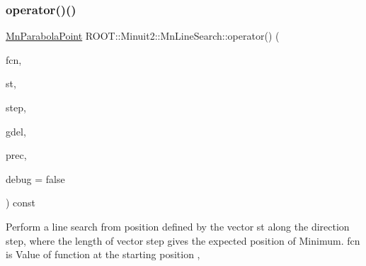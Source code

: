 \subsubsection{\texorpdfstring{operator()()}{operator()()}\hspace{0.1cm}{\footnotesize\ttfamily [1/3]}}
{\footnotesize\ttfamily \mbox{\hyperlink{classROOT_1_1Minuit2_1_1MnParabolaPoint}{Mn\+Parabola\+Point}} R\+O\+O\+T\+::\+Minuit2\+::\+Mn\+Line\+Search\+::operator() (\begin{DoxyParamCaption}\item[{const \mbox{\hyperlink{classROOT_1_1Minuit2_1_1MnFcn}{Mn\+Fcn}} \&}]{fcn,  }\item[{const \mbox{\hyperlink{classROOT_1_1Minuit2_1_1MinimumParameters}{Minimum\+Parameters}} \&}]{st,  }\item[{const \mbox{\hyperlink{namespaceROOT_1_1Minuit2_a62ed97730a1ca8d3fbaec64a19aa11c9}{Mn\+Algebraic\+Vector}} \&}]{step,  }\item[{double}]{gdel,  }\item[{const \mbox{\hyperlink{classROOT_1_1Minuit2_1_1MnMachinePrecision}{Mn\+Machine\+Precision}} \&}]{prec,  }\item[{bool}]{debug = {\ttfamily false} }\end{DoxyParamCaption}) const}

Perform a line search from position defined by the vector st along the direction step, where the length of vector step gives the expected position of Minimum. fcn is Value of function at the starting position ,

